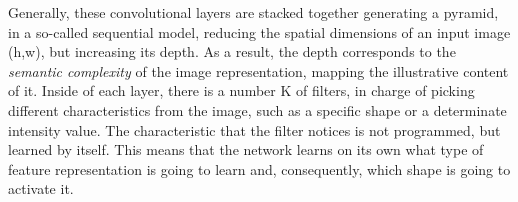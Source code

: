Generally, these convolutional layers are stacked together generating a pyramid, in a so-called sequential model, reducing the spatial dimensions of an input image (h,w), but increasing its depth. As a result, the depth corresponds to the \emph{semantic complexity} of the image representation, mapping the illustrative content of it. Inside of each layer, there is a number K of filters, in charge of picking different characteristics from the image, such as a specific shape or a determinate intensity value. The characteristic that the filter notices is not programmed, but learned by itself. This means that the network learns on its own what type of feature representation is going to learn and, consequently, which shape is going to activate it.


